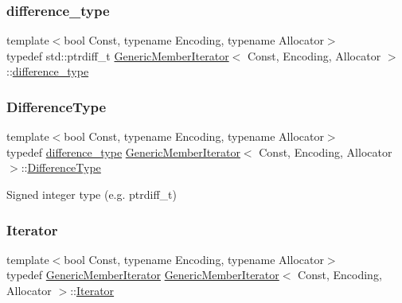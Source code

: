 \subsubsection{\texorpdfstring{difference\+\_\+type}{difference\_type}}
{\footnotesize\ttfamily template$<$bool Const, typename Encoding, typename Allocator$>$ \\
typedef std\+::ptrdiff\+\_\+t \hyperlink{classGenericMemberIterator}{Generic\+Member\+Iterator}$<$ Const, Encoding, Allocator $>$\+::\hyperlink{classGenericMemberIterator_ae60bbcbaec51d36eef299996543872e6}{difference\+\_\+type}}

\mbox{\label{classGenericMemberIterator_aaa13c83e6e0d1f5b413d62cacd8f6a2e}} 
\subsubsection{\texorpdfstring{Difference\+Type}{DifferenceType}}
{\footnotesize\ttfamily template$<$bool Const, typename Encoding, typename Allocator$>$ \\
typedef \hyperlink{classGenericMemberIterator_ae60bbcbaec51d36eef299996543872e6}{difference\+\_\+type} \hyperlink{classGenericMemberIterator}{Generic\+Member\+Iterator}$<$ Const, Encoding, Allocator $>$\+::\hyperlink{classGenericMemberIterator_aaa13c83e6e0d1f5b413d62cacd8f6a2e}{Difference\+Type}}



Signed integer type (e.\+g. {\ttfamily ptrdiff\+\_\+t}) 

\mbox{\label{classGenericMemberIterator_ad1cf1ecf6210b47906c9f179c893a8b8}} 
\subsubsection{\texorpdfstring{Iterator}{Iterator}}
{\footnotesize\ttfamily template$<$bool Const, typename Encoding, typename Allocator$>$ \\
typedef \hyperlink{classGenericMemberIterator}{Generic\+Member\+Iterator} \hyperlink{classGenericMemberIterator}{Generic\+Member\+Iterator}$<$ Const, Encoding, Allocator $>$\+::\hyperlink{classGenericMemberIterator_ad1cf1ecf6210b47906c9f179c893a8b8}{Iterator}}



